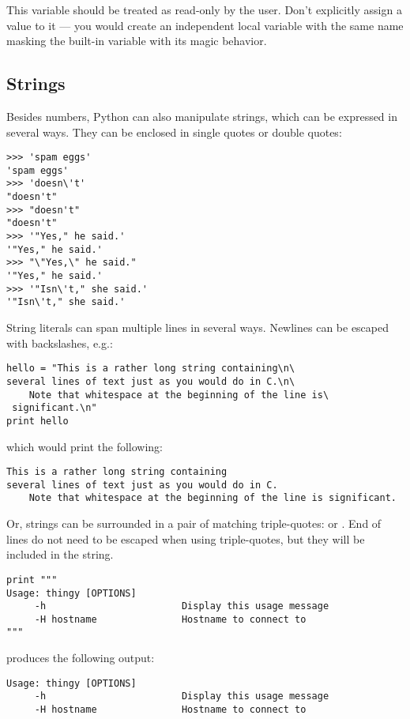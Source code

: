 \documentclass{manual}
\begin{document}
This variable should be treated as read-only by the user.  Don't
explicitly assign a value to it --- you would create an independent
local variable with the same name masking the built-in variable with
its magic behavior.

\subsection{Strings \label{strings}}

Besides numbers, Python can also manipulate strings, which can be
expressed in several ways.  They can be enclosed in single quotes or
double quotes:

\begin{verbatim}
>>> 'spam eggs'
'spam eggs'
>>> 'doesn\'t'
"doesn't"
>>> "doesn't"
"doesn't"
>>> '"Yes," he said.'
'"Yes," he said.'
>>> "\"Yes,\" he said."
'"Yes," he said.'
>>> '"Isn\'t," she said.'
'"Isn\'t," she said.'
\end{verbatim}

String literals can span multiple lines in several ways.  Newlines can
be escaped with backslashes, e.g.:

\begin{verbatim}
hello = "This is a rather long string containing\n\
several lines of text just as you would do in C.\n\
    Note that whitespace at the beginning of the line is\
 significant.\n"
print hello
\end{verbatim}

which would print the following:

\begin{verbatim}
This is a rather long string containing
several lines of text just as you would do in C.
    Note that whitespace at the beginning of the line is significant.
\end{verbatim}

Or, strings can be surrounded in a pair of matching triple-quotes:
\code{"""} or .  End of lines do not need to be escaped
when using triple-quotes, but they will be included in the string.

\begin{verbatim}
print """
Usage: thingy [OPTIONS] 
     -h                        Display this usage message
     -H hostname               Hostname to connect to
"""
\end{verbatim}

produces the following output:

\begin{verbatim}
Usage: thingy [OPTIONS] 
     -h                        Display this usage message
     -H hostname               Hostname to connect to
\end{verbatim}
\end{document}
